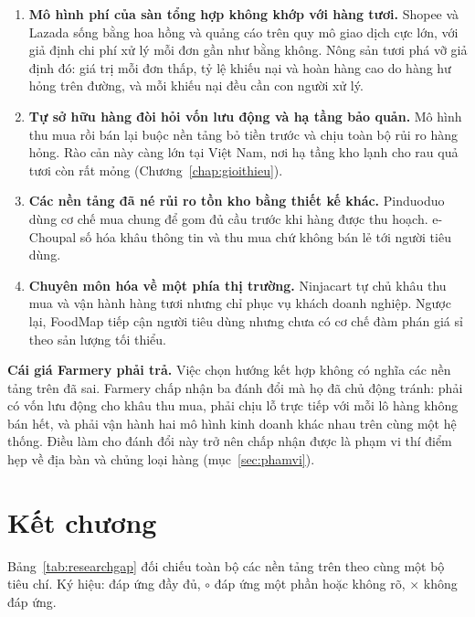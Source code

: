 \begin{enumerate}
    \item[\textbf{N1.}] \textbf{Mô hình phí của sàn tổng hợp không khớp với hàng tươi.} Shopee và Lazada sống bằng hoa hồng và quảng cáo trên quy mô giao dịch cực lớn, với giả định chi phí xử lý mỗi đơn gần như bằng không. Nông sản tươi phá vỡ giả định đó: giá trị mỗi đơn thấp, tỷ lệ khiếu nại và hoàn hàng cao do hàng hư hỏng trên đường, và mỗi khiếu nại đều cần con người xử lý.
    \item[\textbf{N2.}] \textbf{Tự sở hữu hàng đòi hỏi vốn lưu động và hạ tầng bảo quản.} Mô hình thu mua rồi bán lại buộc nền tảng bỏ tiền trước và chịu toàn bộ rủi ro hàng hỏng. Rào cản này càng lớn tại Việt Nam, nơi hạ tầng kho lạnh cho rau quả tươi còn rất mỏng (Chương~\ref{chap:gioithieu}).
    \item[\textbf{N3.}] \textbf{Các nền tảng đã né rủi ro tồn kho bằng thiết kế khác.} Pinduoduo dùng cơ chế mua chung để gom đủ cầu trước khi hàng được thu hoạch. e-Choupal số hóa khâu thông tin và thu mua chứ không bán lẻ tới người tiêu dùng.
    \item[\textbf{N4.}] \textbf{Chuyên môn hóa về một phía thị trường.} Ninjacart tự chủ khâu thu mua và vận hành hàng tươi nhưng chỉ phục vụ khách doanh nghiệp. Ngược lại, FoodMap tiếp cận người tiêu dùng nhưng chưa có cơ chế đàm phán giá sỉ theo sản lượng tối thiểu.
\end{enumerate}

\noindent\textbf{Cái giá Farmery phải trả.} Việc chọn hướng kết hợp không có nghĩa các nền tảng trên đã sai. Farmery chấp nhận ba đánh đổi mà họ đã chủ động tránh: phải có vốn lưu động cho khâu thu mua, phải chịu lỗ trực tiếp với mỗi lô hàng không bán hết, và phải vận hành hai mô hình kinh doanh khác nhau trên cùng một hệ thống. Điều làm cho đánh đổi này trở nên chấp nhận được là phạm vi thí điểm hẹp về địa bàn và chủng loại hàng (mục~\ref{sec:phamvi}).

\section{Kết chương}
\label{subsec:researchgap}

Bảng~\ref{tab:researchgap} đối chiếu toàn bộ các nền tảng trên theo cùng một bộ tiêu chí. Ký hiệu: \checkmark{} đáp ứng đầy đủ, $\circ$ đáp ứng một phần hoặc không rõ, $\times$ không đáp ứng.

